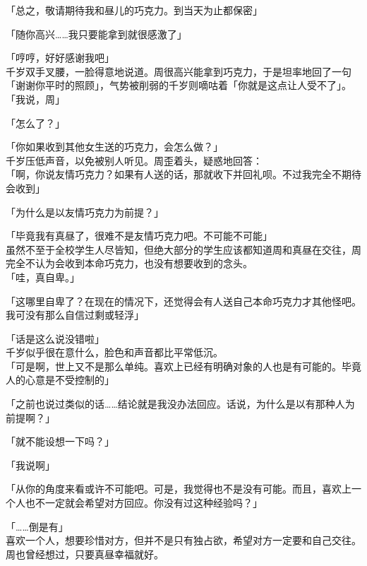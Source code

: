 「总之，敬请期待我和昼儿的巧克力。到当天为止都保密」

「随你高兴……我只要能拿到就很感激了」

「哼哼，好好感谢我吧」\\

千岁双手叉腰，一脸得意地说道。周很高兴能拿到巧克力，于是坦率地回了一句「谢谢你平时的照顾」，气势被削弱的千岁则嘀咕着「你就是这点让人受不了」。\\

「我说，周」

「怎么了？」

「你如果收到其他女生送的巧克力，会怎么做？」\\

千岁压低声音，以免被别人听见。周歪着头，疑惑地回答：\\

「啊，你说友情巧克力？如果有人送的话，那就收下并回礼呗。不过我完全不期待会收到」

「为什么是以友情巧克力为前提？」

「毕竟我有真昼了，很难不是友情巧克力吧。不可能不可能」\\

虽然不至于全校学生人尽皆知，但绝大部分的学生应该都知道周和真昼在交往，周完全不认为会收到本命巧克力，也没有想要收到的念头。\\

「哇，真自卑。」

「这哪里自卑了？在现在的情况下，还觉得会有人送自己本命巧克力才其他怪吧。我可没有那么自信过剩或轻浮」

「话是这么说没错啦」\\

千岁似乎很在意什么，脸色和声音都比平常低沉。\\

「可是啊，世上又不是那么单纯。喜欢上已经有明确对象的人也是有可能的。毕竟人的心意是不受控制的」

「之前也说过类似的话……结论就是我没办法回应。话说，为什么是以有那种人为前提啊？」

「就不能设想一下吗？」

「我说啊」

「从你的角度来看或许不可能吧。可是，我觉得也不是没有可能。而且，喜欢上一个人也不一定就会希望对方回应。你没有过这种经验吗？」

「……倒是有」\\

喜欢一个人，想要珍惜对方，但并不是只有独占欲，希望对方一定要和自己交往。周也曾经想过，只要真昼幸福就好。\\

